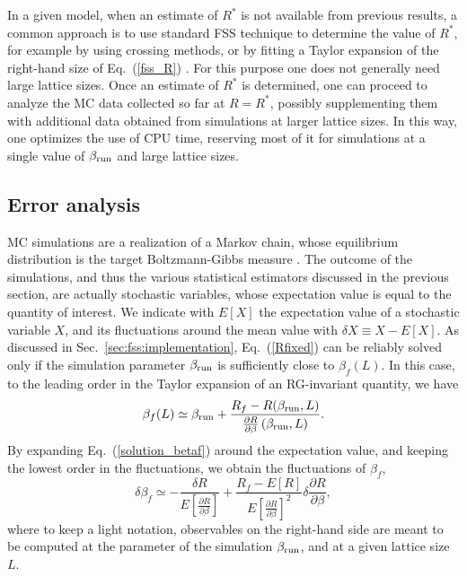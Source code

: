 \documentclass[pre,twocolumn]{revtex4-2}
\begin{document}
In a given model,
when an estimate of $R^*$ is not available from previous results, a common approach is to use standard FSS technique to determine the value of $R^*$, for example by using crossing methods, or by fitting a Taylor expansion of the right-hand size of Eq.~(\ref{fss_R}) \cite{Hasenbusch-10,Hasenbusch-19,Hasenbusch-20,PT-20}.
For this purpose one does not generally need large lattice sizes.
Once an estimate of $R^*$ is determined, one can proceed to analyze the MC data collected so far at $R=R^*$, possibly supplementing them with additional data obtained from simulations at larger lattice sizes.
In this way, one optimizes the use of CPU time, reserving most of it for simulations at a single value of $\beta_{\rm run}$ and large lattice sizes.

\subsection{Error analysis}
\label{sec:fss:error}
MC simulations are a realization of a Markov chain, whose equilibrium distribution is the target Boltzmann-Gibbs measure \cite{Sokal_lecture}.
The outcome of the simulations, and thus
the various statistical estimators discussed in the previous section, are actually stochastic variables, whose expectation value is equal to the quantity of interest.
We indicate with $E[X]$ the expectation value of a stochastic variable $X$, and its fluctuations around the mean value with $\delta X \equiv X - E[X]$.
As discussed in Sec.~\ref{sec:fss:implementation}, Eq.~(\ref{Rfixed}) can be reliably solved only if the simulation parameter $\beta_{\rm run}$ is sufficiently close to $\beta_f(L)$.
In this case, to the leading order in the Taylor expansion of an RG-invariant quantity, we have
\begin{equation}
  \beta_f(L) \simeq \beta_{\rm run} + \frac{R_f - R(\beta_{\rm run}, L)}{\frac{\partial R}{\partial \beta}\left(\beta_{\rm run}, L\right)}.
  \label{solution_betaf}
\end{equation}
By expanding Eq.~(\ref{solution_betaf}) around the expectation value, and keeping the lowest order in the fluctuations, we obtain
the fluctuations of $\beta_f$,
\begin{equation}
    \delta \beta_f \simeq -\frac{\delta R}{E\left[\frac{\partial R}{\partial \beta}\right]}
    + \frac{R_f - E\left[R\right]}{E\left[\frac{\partial R}{\partial \beta}\right]^2}\delta \frac{\partial R}{\partial \beta},
  \label{fluctuations_betaf}
\end{equation}
where to keep a light notation, observables on the right-hand side are meant to be computed at the parameter of the simulation $\beta_{\rm run}$, and at a given lattice size $L$.
\end{document}
